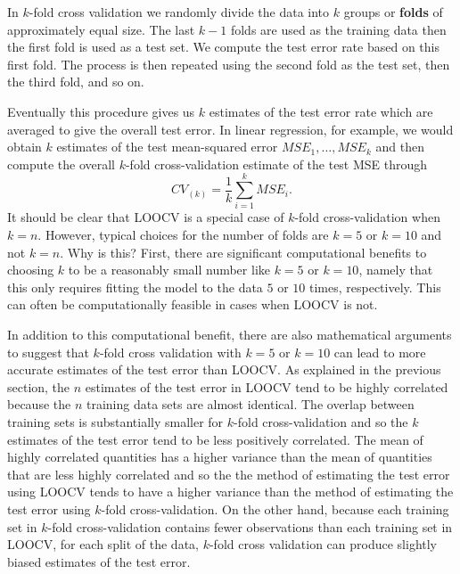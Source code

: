 \documentclass[
]{article}
\begin{document}
In \(k\)-fold cross validation we randomly divide the data into \(k\)
groups or \textbf{folds} of approximately equal size. The last \(k-1\)
folds are used as the training data then the first fold is used as a
test set. We compute the test error rate based on this first fold. The
process is then repeated using the second fold as the test set, then the
third fold, and so on.

Eventually this procedure gives us \(k\) estimates of the test error
rate which are averaged to give the overall test error. In linear
regression, for example, we would obtain \(k\) estimates of the test
mean-squared error \(MSE_1, \ldots, MSE_k\) and then compute the overall
\(k\)-fold cross-validation estimate of the test MSE through
\begin{equation*}
CV_{(k)} = \frac{1}{k} \sum_{i=1}^k MSE_i.
\end{equation*} It should be clear that LOOCV is a special case of
\(k\)-fold cross-validation when \(k=n\). However, typical choices for
the number of folds are \(k=5\) or \(k=10\) and not \(k=n\). Why is
this? First, there are significant computational benefits to choosing
\(k\) to be a reasonably small number like \(k=5\) or \(k=10\), namely
that this only requires fitting the model to the data \(5\) or \(10\)
times, respectively. This can often be computationally feasible in cases
when LOOCV is not.

In addition to this computational benefit, there are also mathematical
arguments to suggest that \(k\)-fold cross validation with \(k=5\) or
\(k=10\) can lead to more accurate estimates of the test error than
LOOCV. As explained in the previous section, the \(n\) estimates of the
test error in LOOCV tend to be highly correlated because the \(n\)
training data sets are almost identical. The overlap between training
sets is substantially smaller for \(k\)-fold cross-validation and so the
\(k\) estimates of the test error tend to be less positively correlated.
The mean of highly correlated quantities has a higher variance than the
mean of quantities that are less highly correlated and so the the method
of estimating the test error using LOOCV tends to have a higher variance
than the method of estimating the test error using \(k\)-fold
cross-validation. On the other hand, because each training set in
\(k\)-fold cross-validation contains fewer observations than each
training set in LOOCV, for each split of the data, \(k\)-fold cross
validation can produce slightly biased estimates of the test error.
\end{document}
